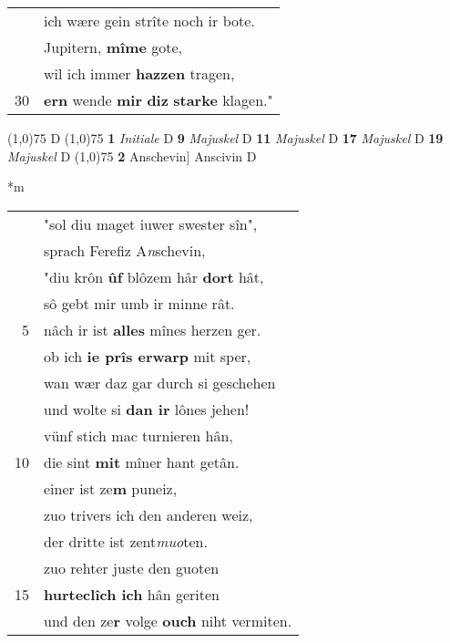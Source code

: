 \documentclass[8pt,a4paper,notitlepage]{article}
\begin{document}
\begin{table}[ht]
\begin{minipage}[t]{0.5\linewidth}
\begin{tabular}{rl}
 & ich wære gein strîte noch ir bote.\\ 
 & Jupitern, \textbf{mîme} gote,\\ 
 & wil ich immer \textbf{hazzen} tragen,\\ 
30 & \textbf{er}\textbf{n} wende \textbf{mir} \textbf{diz} \textbf{starke} klagen."\\ 
\end{tabular}
\scriptsize
\line(1,0){75} \newline
D \newline
\line(1,0){75} \newline
\textbf{1} \textit{Initiale} D  \textbf{9} \textit{Majuskel} D  \textbf{11} \textit{Majuskel} D  \textbf{17} \textit{Majuskel} D  \textbf{19} \textit{Majuskel} D  \newline
\line(1,0){75} \newline
\textbf{2} Anschevin] Anscivin D \newline
\end{minipage}
\hspace{0.5cm}
\begin{minipage}[t]{0.5\linewidth}
\small
\begin{center}*m
\end{center}
\begin{tabular}{rl}
 & "sol diu maget iuwer swester sîn",\\ 
 & sprach Ferefiz A\textit{n}schevin,\\ 
 & "diu krôn \textbf{ûf} blôzem hâr \textbf{dort} hât,\\ 
 & sô gebt mir umb ir minne rât.\\ 
5 & nâch ir ist \textbf{alles} mînes herzen ger.\\ 
 & ob ich \textbf{ie prîs erwarp} mit sper,\\ 
 & wan wær daz gar durch si geschehen\\ 
 & und wolte si \textbf{dan ir} lônes jehen!\\ 
 & vünf stich mac turnieren hân,\\ 
10 & die sint \textbf{mit} mîner hant getân.\\ 
 & einer ist ze\textbf{m} puneiz,\\ 
 & zuo trivers ich den anderen weiz,\\ 
 & der dritte ist zent\textit{muo}ten.\\ 
 & zuo rehter juste den guoten\\ 
15 & \textbf{hurteclîch ich} hân geriten\\ 
 & und den ze\textbf{r} volge \textbf{ouch} niht vermiten.\\ 

\end{tabular}
\end{minipage}
\end{table}
\end{document}
